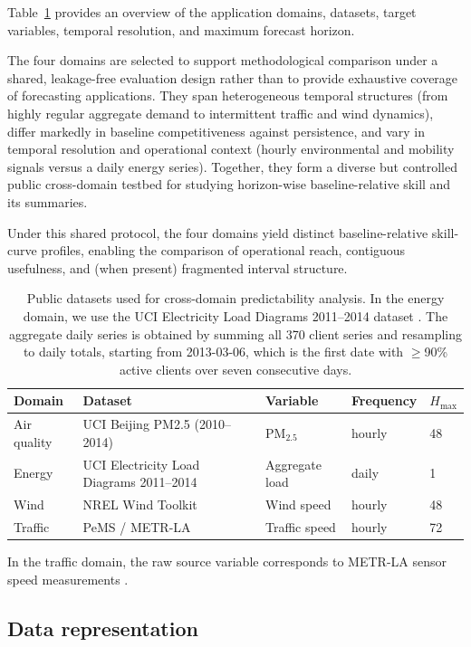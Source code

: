 \documentclass[pdflatex]{sn-jnl}
\begin{document}
Table~\ref{tab:datasets} provides an overview of the application
domains, datasets, target variables, temporal resolution, and maximum
forecast horizon.

The four domains are selected to support methodological comparison under a
shared, leakage-free evaluation design rather than to provide exhaustive
coverage of forecasting applications. They span heterogeneous temporal
structures (from highly regular aggregate demand to intermittent traffic
and wind dynamics), differ markedly in baseline competitiveness against
persistence, and vary in temporal resolution and operational context
(hourly environmental and mobility signals versus a daily energy series).
Together, they form a diverse but controlled public cross-domain testbed
for studying horizon-wise baseline-relative skill and its summaries.

Under this shared protocol, the four domains yield distinct baseline-relative skill-curve profiles, enabling the comparison of operational reach, contiguous usefulness, and (when present) fragmented interval structure.

\begin{table}[h]
\centering
\small
\setlength{\tabcolsep}{3pt}
\begin{tabular}{lllll}
\toprule
Domain & Dataset & Variable & Frequency & $H_{\max}$ \\
\midrule
Air quality & UCI Beijing PM2.5 (2010--2014) & PM$_{2.5}$ & hourly & 48 \\
Energy & UCI Electricity Load Diagrams 2011--2014 & Aggregate load & daily & 1 \\
Wind & NREL Wind Toolkit & Wind speed & hourly & 48 \\
Traffic & PeMS / METR-LA & Traffic speed & hourly & 72 \\
\bottomrule
\end{tabular}
\caption{Public datasets used for cross-domain predictability analysis.
In the energy domain, we use the UCI Electricity Load Diagrams
2011--2014 dataset \citep{trindade2015}.
The aggregate daily series is obtained by summing all 370 client series
and resampling to daily totals, starting from 2013-03-06, which is the
first date with $\geq$90\% active clients over seven consecutive days.}
\label{tab:datasets}
\end{table}

In the traffic domain, the raw source variable corresponds to METR-LA
sensor speed measurements \citep{li2018dcrnn}.

\subsection{Data representation}
\end{document}
